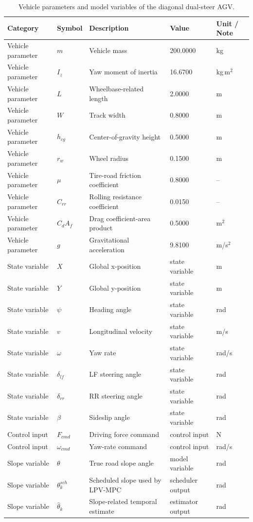 \documentclass{ieeeaccess}
\begin{document}
\begin{table}[!t]
\centering
\caption{Vehicle parameters and model variables of the diagonal dual-steer AGV.}
\label{tab:vehicle_params}
\footnotesize
\begin{tabular}{lllll}
\hline
Category & Symbol & Description & Value & Unit / Note \\
\hline
Vehicle parameter & $m$ & Vehicle mass & 200.0000 & kg \\
Vehicle parameter & $I_z$ & Yaw moment of inertia & 16.6700 & kg\,m$^2$ \\
Vehicle parameter & $L$ & Wheelbase-related length & 2.0000 & m \\
Vehicle parameter & $W$ & Track width & 0.8000 & m \\
Vehicle parameter & $h_{cg}$ & Center-of-gravity height & 0.5000 & m \\
Vehicle parameter & $r_w$ & Wheel radius & 0.1500 & m \\
Vehicle parameter & $\mu$ & Tire-road friction coefficient & 0.8000 & -- \\
Vehicle parameter & $C_{rr}$ & Rolling resistance coefficient & 0.0150 & -- \\
Vehicle parameter & $C_dA_f$ & Drag coefficient-area product & 0.5000 & m$^2$ \\
Vehicle parameter & $g$ & Gravitational acceleration & 9.8100 & m/s$^2$ \\
State variable & $X$ & Global x-position & state variable & m \\
State variable & $Y$ & Global y-position & state variable & m \\
State variable & $\psi$ & Heading angle & state variable & rad \\
State variable & $v$ & Longitudinal velocity & state variable & m/s \\
State variable & $\omega$ & Yaw rate & state variable & rad/s \\
State variable & $\delta_{lf}$ & LF steering angle & state variable & rad \\
State variable & $\delta_{rr}$ & RR steering angle & state variable & rad \\
State variable & $\beta$ & Sideslip angle & state variable & rad \\
Control input & $F_{cmd}$ & Driving force command & control input & N \\
Control input & $\omega_{cmd}$ & Yaw-rate command & control input & rad/s \\
Slope variable & $\theta$ & True road slope angle & model variable & rad \\
Slope variable & $\theta_k^{sch}$ & Scheduled slope used by LPV-MPC & scheduler output & rad \\
Slope variable & $\hat{\theta}_k$ & Slope-related temporal estimate & estimator output & rad \\
\hline
\end{tabular}
\end{table}
\FloatBarrier
\end{document}
